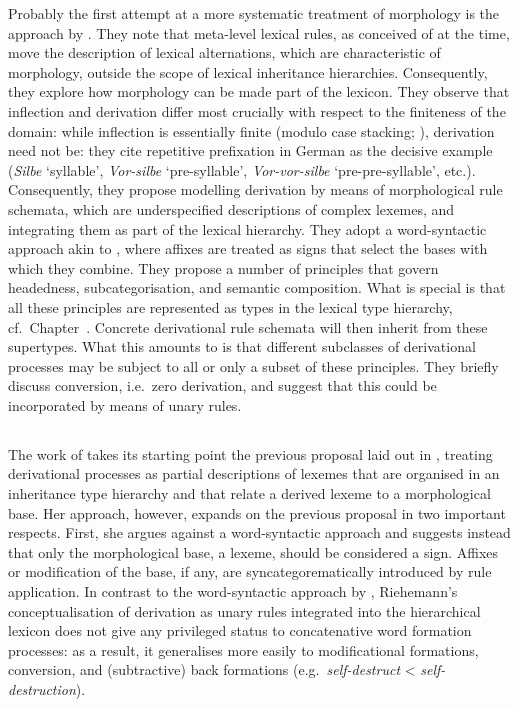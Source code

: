 \documentclass[output=paper
 	        ,biblatex
                ,babelshorthands
                ,newtxmath
                ,draftmode
                ,colorlinks, citecolor=brown
]{langscibook}
\begin{document}
Probably the first attempt at a more systematic treatment of
morphology is the approach by \citet{Krieger:Nerbonne:93}. They note
that meta-level lexical rules, as conceived of at the time, move the
description of lexical alternations, which are characteristic of
morphology, outside the scope of lexical inheritance
hierarchies. Consequently, they explore how morphology can be made
part of the lexicon. They observe that inflection and derivation
differ most crucially with respect to the finiteness of the domain:
while inflection is essentially finite (modulo case stacking;
\citealp{Sadler06,malouf:head-driven}), derivation need not be:
they cite repetitive prefixation in German as the decisive example
(\textit{Silbe} `syllable', \textit{Vor-silbe} `pre-syllable',
\textit{Vor-vor-silbe} `pre-pre-syllable', etc.). Consequently, they
propose  modelling derivation by means of morphological rule schemata,
which are underspecified descriptions of complex lexemes, and
integrating them as part of the lexical hierarchy. They adopt a
word-syntactic approach akin to \citet{Lieber92}, where affixes are
treated as signs that select the bases with which they combine. They
propose a number of principles that govern headedness,
subcategorisation, and semantic composition. What is special is that
all these principles are represented as types in the lexical type
hierarchy, cf.\ Chapter~. Concrete
derivational rule schemata will then inherit from these
supertypes. What this amounts to is that different subclasses of
derivational processes may be subject to all or only a subset of these
principles. They briefly discuss conversion, i.e.\ zero derivation, and
suggest that this could be incorporated by means of unary rules.



\subsection{\protect\citet{Riehemann98}}

The work of \citet{Riehemann98} takes its starting point the
previous proposal laid out in \citet{Krieger:Nerbonne:93}, treating
derivational processes as partial descriptions of lexemes that are
organised in an inheritance type hierarchy and that relate a derived
lexeme to a morphological base.  Her approach, however, expands on the
previous proposal in two important respects. First, she argues against
a word-syntactic approach and suggests instead that only the
morphological base, a lexeme, should be considered a sign. Affixes or
modification of the base, if any, are syncategorematically introduced
by rule application. In contrast to the word-syntactic approach by
\citet{Krieger:Nerbonne:93}, Riehemann's conceptualisation of
derivation as unary rules integrated into the hierarchical lexicon
does not give any privileged status to concatenative word formation
processes: as a result, it generalises more easily to modificational
formations, conversion, and  (subtractive) back formations
(e.g.\ \textit{self-destruct} < \textit{self-destruction}). 
\end{document}
